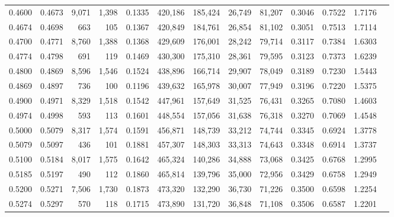 \begin{tabular}{rrrrrrrrrrrrr}
0.4600 & 0.4673 &  9,071 & 1,398 &                                     0.1335 & 420,186 & 185,424 &  26,749 &  81,207 & 0.3046 & 0.7522 & 1.7176 \\
0.4674 & 0.4698 &    663 &   105 &                                     0.1367 & 420,849 & 184,761 &  26,854 &  81,102 & 0.3051 & 0.7513 & 1.7114 \\
0.4700 & 0.4771 &  8,760 & 1,388 &                                     0.1368 & 429,609 & 176,001 &  28,242 &  79,714 & 0.3117 & 0.7384 & 1.6303 \\
0.4774 & 0.4798 &    691 &   119 &                                     0.1469 & 430,300 & 175,310 &  28,361 &  79,595 & 0.3123 & 0.7373 & 1.6239 \\
0.4800 & 0.4869 &  8,596 & 1,546 &                                     0.1524 & 438,896 & 166,714 &  29,907 &  78,049 & 0.3189 & 0.7230 & 1.5443 \\
0.4869 & 0.4897 &    736 &   100 &                                     0.1196 & 439,632 & 165,978 &  30,007 &  77,949 & 0.3196 & 0.7220 & 1.5375 \\
0.4900 & 0.4971 &  8,329 & 1,518 &                                     0.1542 & 447,961 & 157,649 &  31,525 &  76,431 & 0.3265 & 0.7080 & 1.4603 \\
0.4974 & 0.4998 &    593 &   113 &                                     0.1601 & 448,554 & 157,056 &  31,638 &  76,318 & 0.3270 & 0.7069 & 1.4548 \\
0.5000 & 0.5079 &  8,317 & 1,574 &                                     0.1591 & 456,871 & 148,739 &  33,212 &  74,744 & 0.3345 & 0.6924 & 1.3778 \\
0.5079 & 0.5097 &    436 &   101 &                                     0.1881 & 457,307 & 148,303 &  33,313 &  74,643 & 0.3348 & 0.6914 & 1.3737 \\
0.5100 & 0.5184 &  8,017 & 1,575 &                                     0.1642 & 465,324 & 140,286 &  34,888 &  73,068 & 0.3425 & 0.6768 & 1.2995 \\
0.5185 & 0.5197 &    490 &   112 &                                     0.1860 & 465,814 & 139,796 &  35,000 &  72,956 & 0.3429 & 0.6758 & 1.2949 \\
0.5200 & 0.5271 &  7,506 & 1,730 &                                     0.1873 & 473,320 & 132,290 &  36,730 &  71,226 & 0.3500 & 0.6598 & 1.2254 \\
0.5274 & 0.5297 &    570 &   118 &                                     0.1715 & 473,890 & 131,720 &  36,848 &  71,108 & 0.3506 & 0.6587 & 1.2201 \\

\end{tabular}
